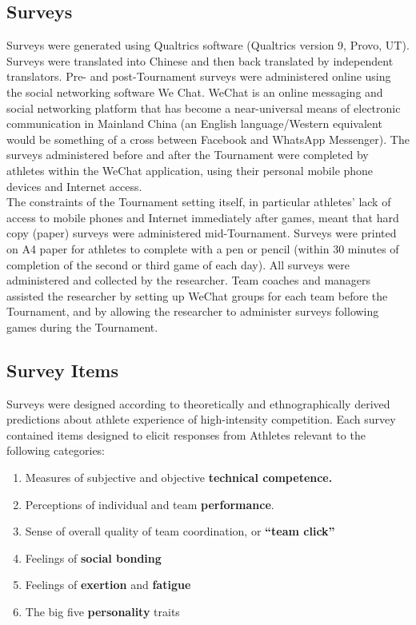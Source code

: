 \documentclass[12pt]{report}
\begin{document}
\subsection{Surveys}
Surveys were generated using Qualtrics software (Qualtrics version 9, Provo, UT). Surveys were translated into Chinese and then back translated by independent translators. Pre- and post-Tournament surveys were administered online using the social networking software We Chat. WeChat is an online messaging and social networking platform that has become a near-universal means of electronic communication in Mainland China (an English language/Western equivalent would be something of a cross between Facebook and WhatsApp Messenger). The surveys administered before and after the Tournament were completed by athletes within the WeChat application, using their personal mobile phone devices and Internet access.  \\

The constraints of the Tournament setting itself, in particular athletes’ lack of access to mobile phones and Internet immediately after games, meant that hard copy (paper) surveys were administered mid-Tournament. Surveys were printed on A4 paper for athletes to complete with a pen or pencil (within 30 minutes of completion of the second or third game of each day). All surveys were administered and collected by the researcher. Team coaches and managers assisted the researcher by setting up WeChat groups for each team before the Tournament, and by allowing the researcher to administer surveys following games during the Tournament.  \\


\subsection{Survey Items}

Surveys were designed according to theoretically and ethnographically derived predictions about athlete experience of high-intensity competition. Each survey contained items designed to elicit responses from Athletes relevant to the following categories:

\begin{enumerate}
\item Measures of subjective and objective \textbf{technical competence.}
\item Perceptions of individual and team \textbf{performance}.
\item Sense of overall quality of team coordination, or \textbf{``team click''}
\item Feelings of \textbf{social bonding}
\item Feelings of \textbf{exertion} and \textbf{fatigue}
\item The big five \textbf{personality} traits
\end{enumerate}
\end{document}
